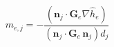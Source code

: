 $$
m_{e,j} = - \frac{\left(\mathbf n_j\cdot \mathbf G_e\nabla\hat h_e\right)}{\left(\mathbf n_j\cdot \mathbf G_e\,\mathbf n_j\right) d_j}
$$
